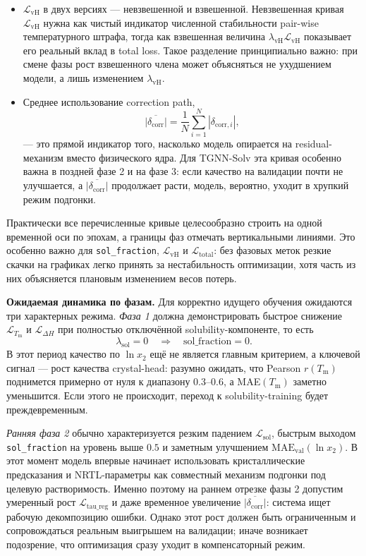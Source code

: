 \documentclass[11pt]{article}
\begin{document}
\begin{itemize}
  \item $\mathcal{L}_{\mathrm{vH}}$ в двух версиях --- невзвешенной и взвешенной. Невзвешенная кривая $\mathcal{L}_{\mathrm{vH}}$ нужна как чистый индикатор численной стабильности pair-wise температурного штрафа, тогда как взвешенная величина $\lambda_{\mathrm{vH}}\mathcal{L}_{\mathrm{vH}}$ показывает его реальный вклад в total loss. Такое разделение принципиально важно: при смене фазы рост взвешенного члена может объясняться не ухудшением модели, а лишь изменением $\lambda_{\mathrm{vH}}$.
  \item Среднее использование correction path,
  \begin{equation*}
  \overline{|\delta_{\mathrm{corr}}|} = \frac{1}{N}\sum_{i=1}^{N}|\delta_{\mathrm{corr},i}|,
  \end{equation*}
  --- это прямой индикатор того, насколько модель опирается на residual-механизм вместо физического ядра. Для TGNN-Solv эта кривая особенно важна в поздней фазе 2 и на фазе 3: если качество на валидации почти не улучшается, а $\overline{|\delta_{\mathrm{corr}}|}$ продолжает расти, модель, вероятно, уходит в хрупкий режим подгонки.
\end{itemize}

Практически все перечисленные кривые целесообразно строить на одной временной оси по эпохам, а границы фаз отмечать вертикальными линиями. Это особенно важно для \texttt{sol\_fraction}, $\mathcal{L}_{\mathrm{vH}}$ и $\mathcal{L}_{\mathrm{total}}$: без фазовых меток резкие скачки на графиках легко принять за нестабильность оптимизации, хотя часть из них объясняется плановым изменением весов потерь.

\textbf{Ожидаемая динамика по фазам.} Для корректно идущего обучения ожидаются три характерных режима. \textit{Фаза 1} должна демонстрировать быстрое снижение $\mathcal{L}_{T_{\mathrm{m}}}$ и $\mathcal{L}_{\Delta H}$ при полностью отключённой solubility-компоненте, то есть
\begin{equation*}
\lambda_{\mathrm{sol}}=0 \quad \Rightarrow \quad \mathrm{sol\_fraction}=0.
\end{equation*}
В этот период качество по $\ln x_2$ ещё не является главным критерием, а ключевой сигнал --- рост качества crystal-head: разумно ожидать, что Pearson $r(T_{\mathrm{m}})$ поднимется примерно от нуля к диапазону $0.3$--$0.6$, а MAE$(T_{\mathrm{m}})$ заметно уменьшится. Если этого не происходит, переход к solubility-training будет преждевременным.

\textit{Ранняя фаза 2} обычно характеризуется резким падением $\mathcal{L}_{\mathrm{sol}}$, быстрым выходом \texttt{sol\_fraction} на уровень выше $0.5$ и заметным улучшением $\mathrm{MAE}_{\mathrm{val}}(\ln x_2)$. В этот момент модель впервые начинает использовать кристаллические предсказания и NRTL-параметры как совместный механизм подгонки под целевую растворимость. Именно поэтому на раннем отрезке фазы 2 допустим умеренный рост $\mathcal{L}_{\mathrm{tau\_reg}}$ и даже временное увеличение $\overline{|\delta_{\mathrm{corr}}|}$: система ищет рабочую декомпозицию ошибки. Однако этот рост должен быть ограниченным и сопровождаться реальным выигрышем на валидации; иначе возникает подозрение, что оптимизация сразу уходит в компенсаторный режим.
\end{document}

